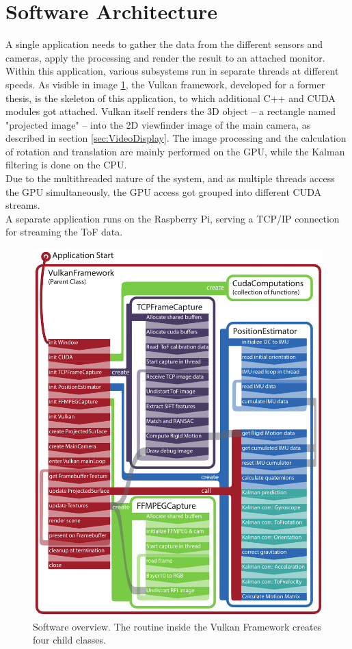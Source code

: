 \section{Software Architecture}
\label{sec:Software}
A single application needs to gather the data from the different sensors and cameras, apply the processing and render the result to an attached monitor. Within this application, various subsystems run in separate threads at different speeds. As visible in image \ref{fig:sw_concept}, the Vulkan framework, developed for a former thesis, is the skeleton of this application, to which additional C++ and CUDA modules got attached. Vulkan itself renders the 3D object – a rectangle named "projected image" – into the 2D viewfinder image of the main camera, as described in section \ref{sec:VideoDisplay}. The image processing and the calculation of rotation and translation are mainly performed on the GPU, while the Kalman filtering is done on the CPU.\\
Due to the multithreaded nature of the system, and as multiple threads access the GPU simultaneously, the GPU access got grouped into different CUDA streams. \\
A separate application runs on the Raspberry Pi, serving a TCP/IP connection for streaming the ToF data. 

\begin{figure}[H]
    \centering
    \includegraphics[width=1.0\textwidth]{images/SoftwareArchitecture.pdf}
    \caption{Software overview. The routine inside the Vulkan Framework creates four child classes.}
    \label{fig:sw_concept}
\end{figure}

